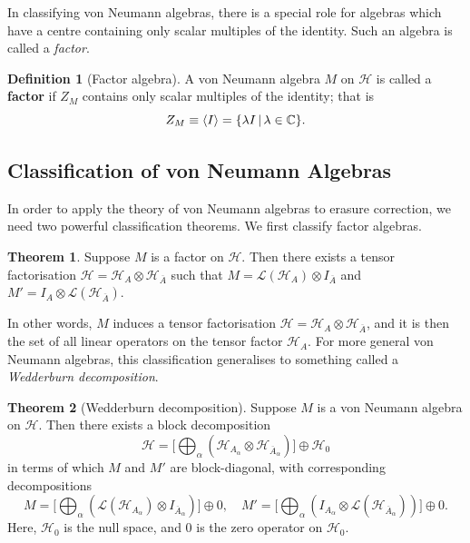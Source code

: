 \documentclass[12pt,a4paper]{report}
\numberwithin{equation}{section}
\newcommand{\ol}[1]{\overline{#1}}
\theoremstyle{definition}
\newtheorem{definition}{Definition}[section]
\theoremstyle{theorem}
\newtheorem{theorem}{Theorem}[section]
\theoremstyle{theorem}
\theoremstyle{example}
\theoremstyle{definition}
\begin{document}
In classifying von Neumann algebras, there is a special role for algebras which have a centre containing only scalar multiples of the identity. Such an algebra is called a \textit{factor}.
\begin{definition}[Factor algebra]
	A von Neumann algebra $M$ on $\mathcal{H}$ is called a \textbf{factor} if $Z_{M}$ contains only scalar multiples of the identity; that is
	\begin{equation}
		Z_{M}\equiv\braket{I}=\{\lambda I\,|\,\lambda\in\mathbb{C}\}.
	\end{equation}
\end{definition}
\subsection{Classification of von Neumann Algebras}
In order to apply the theory of von Neumann algebras to erasure correction, we need two powerful classification theorems. We first classify factor algebras.
\begin{theorem}\label{factorclass}
	Suppose $M$ is a factor on $\mathcal{H}$. Then there exists a tensor factorisation $\mathcal{H}=\mathcal{H}_{A}\otimes\mathcal{H}_{\ol{A}}$ such that $M=\mathcal{L}(\mathcal{H}_{A})\otimes I_{\ol{A}}$ and $M'=I_{A}\otimes\mathcal{L}(\mathcal{H}_{\ol{A}})$.
\end{theorem}
In other words, $M$ induces a tensor factorisation $\mathcal{H}=\mathcal{H}_{A}\otimes\mathcal{H}_{\ol{A}}$, and it is then the set of all linear operators on the tensor factor $\mathcal{H}_{A}$. For more general von Neumann algebras, this classification generalises to something called a \textit{Wedderburn decomposition}.
\begin{theorem}[Wedderburn decomposition]\label{vnclass}
	Suppose $M$ is a von Neumann algebra on $\mathcal{H}$. Then there exists a block decomposition 
	\begin{equation} 
		\mathcal{H}=\big[\bigoplus_{\alpha}(\mathcal{H}_{A_{\alpha}}\otimes\mathcal{H}_{\ol{A}_{\alpha}})\big]\oplus \mathcal{H}_{0}
	\end{equation}
	in terms of which $M$ and $M'$ are block-diagonal, with corresponding decompositions
	\begin{equation}\label{wburn}
		M=\big[\bigoplus_{\alpha}(\mathcal{L}(\mathcal{H}_{A_{\alpha}})\otimes I_{\ol{A}_{\alpha}})\big]\oplus0,\quad M'=\big[\bigoplus_{\alpha}(I_{A_{\alpha}}\otimes\mathcal{L}(\mathcal{H}_{\ol{A}_{\alpha}}))\big]\oplus0.
	\end{equation}
	Here, $\mathcal{H}_{0}$ is the null space, and $0$ is the zero operator on $\mathcal{H}_{0}$.
\end{theorem}
\end{document}
